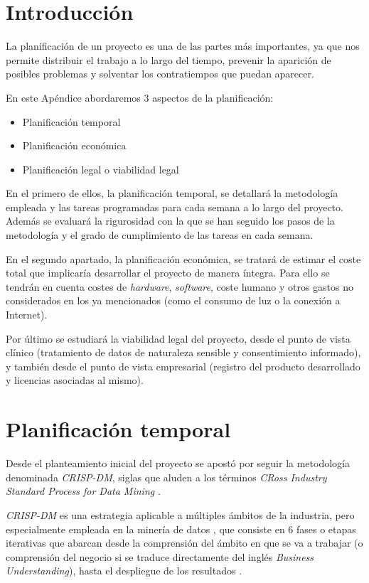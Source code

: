 
\section{Introducción}

La planificación de un proyecto es una de las partes más importantes, ya que nos permite distribuir el trabajo a lo largo del tiempo, prevenir la aparición de posibles problemas y solventar los contratiempos que puedan aparecer.

En este Apéndice abordaremos 3 aspectos de la planificación:
\begin{itemize}[itemsep=0.1em]
    \item Planificación temporal
    \item Planificación económica 
    \item Planificación legal o viabilidad legal
\end{itemize}

En el primero de ellos, la planificación temporal, se detallará la metodología empleada y las tareas programadas para cada semana a lo largo del proyecto. Además se evaluará la rigurosidad con la que se han seguido los pasos de la metodología y el grado de cumplimiento de las tareas en cada semana.

En el segundo apartado, la planificación económica, se tratará de estimar el coste total que implicaría desarrollar el proyecto de manera íntegra. Para ello se tendrán en cuenta costes de \textit{hardware}, \textit{software}, coste humano y otros gastos no considerados en los ya mencionados (como el consumo de luz o la conexión a Internet).

Por último se estudiará la viabilidad legal del proyecto, desde el punto de vista clínico (tratamiento de datos de naturaleza sensible y consentimiento informado), y también desde el punto de vista empresarial (registro del producto desarrollado y licencias asociadas al mismo).

\section{Planificación temporal}

Desde el planteamiento inicial del proyecto se apostó por seguir la metodología denominada \textit{CRISP-DM}, siglas que aluden a los términos \textit{CRoss Industry Standard Process for Data Mining} \cite{crispdm:schorer}. 

\textit{CRISP-DM} es una estrategia aplicable a múltiples ámbitos de la industria, pero especialmente empleada en la minería de datos \cite{crispdm:azevedo}, que consiste en 6 fases o etapas iterativas que abarcan desde la comprensión del ámbito en que se va a trabajar (o comprensión del negocio si se traduce directamente del inglés \textit{Business Understanding}), hasta el despliegue de los resultados \cite{crispdm:schorer,crispdm:niaksu}.

